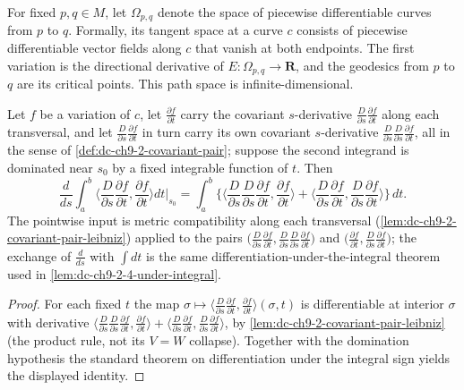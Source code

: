 \begin{remark}
  \label{rem:dc-ch9-2-7}
  For fixed $p,q\in M$, let $\Omega_{p,q}$ denote the space of piecewise
  differentiable curves from $p$ to $q$. Formally, its tangent space at a curve
  $c$ consists of piecewise differentiable vector fields along $c$ that vanish
  at both endpoints. The first variation is the directional derivative of
  $E:\Omega_{p,q}\to\mathbf{R}$, and the geodesics from $p$ to $q$ are its
  critical points. This path space is infinite-dimensional.
\end{remark}
\begin{lemma}
  \label{lem:dc-ch9-2-8-under-integral}
  \leanok
  Let $f$ be a variation of $c$, let $\frac{\partial f}{\partial t}$ carry the covariant
  $s$-derivative $\frac{D}{\partial s}\frac{\partial f}{\partial t}$ along each transversal,
  and let $\frac{D}{\partial s}\frac{\partial f}{\partial t}$ in turn carry its own covariant
  $s$-derivative $\frac{D}{\partial s}\frac{D}{\partial s}\frac{\partial f}{\partial t}$, all
  in the sense of \cref{def:dc-ch9-2-covariant-pair}; suppose the second integrand is
  dominated near $s_0$ by a fixed integrable function of $t$. Then
  $$
  \frac{d}{ds}\int_a^b\Big\langle\frac{D}{\partial s}\frac{\partial f}{\partial t},
    \frac{\partial f}{\partial t}\Big\rangle dt\Big|_{s_0}
  = \int_a^b\Big\{\Big\langle\frac{D}{\partial s}\frac{D}{\partial s}\frac{\partial f}{\partial t},
    \frac{\partial f}{\partial t}\Big\rangle
    + \Big\langle\frac{D}{\partial s}\frac{\partial f}{\partial t},
      \frac{D}{\partial s}\frac{\partial f}{\partial t}\Big\rangle\Big\}\,dt .
  $$
  The pointwise input is metric compatibility along each transversal
  (\cref{lem:dc-ch9-2-covariant-pair-leibniz}) applied to the pairs
  $\big(\frac{D}{\partial s}\frac{\partial f}{\partial t},
    \frac{D}{\partial s}\frac{D}{\partial s}\frac{\partial f}{\partial t}\big)$ and
  $\big(\frac{\partial f}{\partial t},\frac{D}{\partial s}\frac{\partial f}{\partial t}\big)$;
  the exchange of $\frac{d}{ds}$ with $\int dt$ is the same differentiation-under-the-integral
  theorem used in \cref{lem:dc-ch9-2-4-under-integral}.
\end{lemma}
\begin{proof}
  \leanok
  \sketch
  For each fixed $t$ the map
  $\sigma\mapsto\langle\frac{D}{\partial s}\frac{\partial f}{\partial t},\frac{\partial f}{\partial t}\rangle(\sigma,t)$
  is differentiable at interior $\sigma$ with derivative
  $\langle\frac{D}{\partial s}\frac{D}{\partial s}\frac{\partial f}{\partial t},\frac{\partial f}{\partial t}\rangle
  +\langle\frac{D}{\partial s}\frac{\partial f}{\partial t},\frac{D}{\partial s}\frac{\partial f}{\partial t}\rangle$,
  by \cref{lem:dc-ch9-2-covariant-pair-leibniz} (the product rule, not its $V=W$ collapse).
  Together with the domination hypothesis the standard theorem on differentiation under the
  integral sign yields the displayed identity.
\end{proof}
